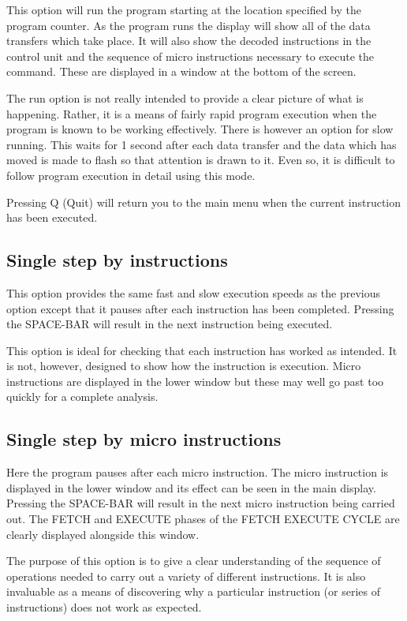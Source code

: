 \documentclass{article}
\begin{document}
This option will run the program starting at the location specified by the program counter. As the program runs the display will show all of the data transfers which take place. It will also show the decoded instructions in the control unit and the sequence of micro instructions necessary to execute the command. These are displayed in a window at the bottom of the screen.

The run option is not really intended to provide a clear picture of what is happening. Rather, it is a means of fairly rapid program execution when the program is known to be working effectively. There is however an option for slow running. This waits for 1 second after each data transfer and the data which has moved is made to flash so that attention is drawn to it. Even so, it is difficult to follow program execution in detail using this mode.

Pressing Q (Quit) will return you to the main menu when the current instruction has been executed.

\subsection{Single step by instructions}

This option provides the same fast and slow execution speeds as the previous option except that it pauses after each instruction has been completed. Pressing the SPACE-BAR will result in the next instruction being executed.

This option is ideal for checking that each instruction has worked as intended. It is not, however, designed to show how the instruction is execution. Micro instructions are displayed in the lower window but these may well go past too quickly for a complete analysis.

\subsection{Single step by micro instructions}

Here the program pauses after each micro instruction. The micro instruction is displayed in the lower window and its effect can be seen in the main display. Pressing the SPACE-BAR will result in the next micro instruction being carried out. The FETCH and EXECUTE phases of the FETCH EXECUTE CYCLE are clearly displayed alongside this window.

The purpose of this option is to give a clear understanding of the sequence of operations needed to carry out a variety of different instructions. It is also invaluable as a means of discovering why a particular instruction (or series of instructions) does not work as expected.
\end{document}
